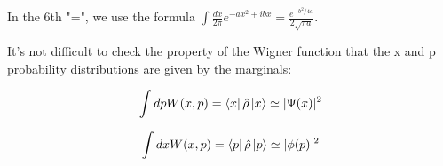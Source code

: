 \documentclass{article}
\begin{document}
        In the 6th "=", we use the formula $\int\frac{dx}{2\pi}e^{-ax^2+ibx} = \frac{e^{-b^2/4a}}{2\sqrt{\pi a}}$. 

        It's not difficult to check the property of the Wigner function that the x and p probability distributions are given by the marginals:

        \begin{equation}
            \int dp W(x, p) = \bra{x}\hat{\rho}\ket{x} \simeq |\Psi(x)|^2
        \end{equation}

        \begin{equation}
            \int dx W(x, p) = \bra{p}\hat{\rho}\ket{p} \simeq |\phi(p)|^2
        \end{equation}
\end{document}
